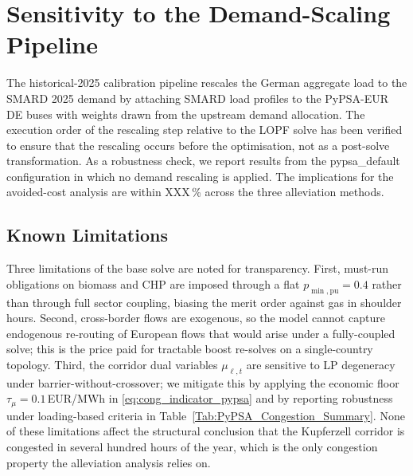 \section{Sensitivity to the Demand-Scaling Pipeline}\label{Appendix:Demand_Scaling}

The historical-2025 calibration pipeline rescales the German aggregate load to the SMARD 2025 demand by attaching SMARD load profiles to the PyPSA-EUR DE buses with weights drawn from the upstream demand allocation. The execution order of the rescaling step relative to the LOPF solve has been verified to ensure that the rescaling occurs before the optimisation, not as a post-solve transformation. As a robustness check, we report results from the pypsa\_default configuration in which no demand rescaling is applied. The implications for the avoided-cost analysis are within XXX\,\% across the three alleviation methods.



\subsection{Known Limitations}
 
Three limitations of the base solve are noted for transparency. First, must-run obligations on biomass and CHP are imposed through a flat $p_{\min,\mathrm{pu}} = 0.4$ rather than through full sector coupling, biasing the merit order against gas in shoulder hours. Second, cross-border flows are exogenous, so the model cannot capture endogenous re-routing of European flows that would arise under a fully-coupled solve; this is the price paid for tractable boost re-solves on a single-country topology. Third, the corridor dual variables $\mu_{\ell,t}$ are sensitive to LP degeneracy under barrier-without-crossover; we mitigate this by applying the economic floor $\tau_\mu = 0.1$\,EUR/MWh in \eqref{eq:cong_indicator_pypsa} and by reporting robustness under loading-based criteria in Table~\ref{Tab:PyPSA_Congestion_Summary}. None of these limitations affect the structural conclusion that the Kupferzell corridor is congested in several hundred hours of the year, which is the only congestion property the alleviation analysis relies on.
